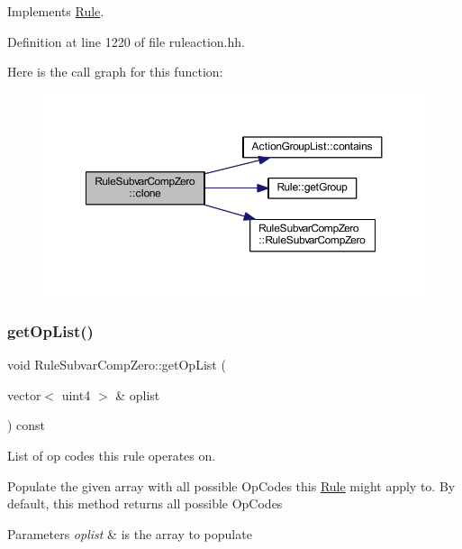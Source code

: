 Implements \mbox{\hyperlink{class_rule_a70de90a76461bfa7ea0b575ce3c11e4d}{Rule}}.



Definition at line 1220 of file ruleaction.\+hh.

Here is the call graph for this function\+:
\nopagebreak
\begin{figure}[H]
\begin{center}
\leavevmode
\includegraphics[width=350pt]{class_rule_subvar_comp_zero_a4a65d70ce76be64204bd88520d768a79_cgraph}
\end{center}
\end{figure}
\mbox{\label{class_rule_subvar_comp_zero_aaf2a3915863894c93133588aded9ca8d}} 
\subsubsection{\texorpdfstring{getOpList()}{getOpList()}}
{\footnotesize\ttfamily void Rule\+Subvar\+Comp\+Zero\+::get\+Op\+List (\begin{DoxyParamCaption}\item[{vector$<$ uint4 $>$ \&}]{oplist }\end{DoxyParamCaption}) const\hspace{0.3cm}{\ttfamily [virtual]}}



List of op codes this rule operates on. 

Populate the given array with all possible Op\+Codes this \mbox{\hyperlink{class_rule}{Rule}} might apply to. By default, this method returns all possible Op\+Codes 
\begin{DoxyParams}{Parameters}
{\em oplist} & is the array to populate \\
\hline
\end{DoxyParams}


